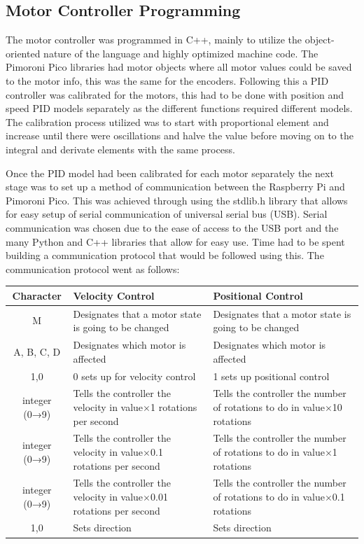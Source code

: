 \documentclass{article}
\begin{document}
\subsection{Motor Controller Programming}
The motor controller was programmed in C++, mainly to utilize the object-oriented nature of the language and highly optimized machine code. The Pimoroni Pico libraries
had motor objects where all motor values could be saved to the motor info, this was the same for the encoders. Following this a PID controller was calibrated for the
motors, this had to be done with position and speed PID models separately as the different functions required different models. The calibration process utilized was to
start with proportional element and increase until there were oscillations and halve the value before moving on to the integral and derivate elements with the same process.
\par
Once the PID model had been calibrated for each motor separately the next stage was to set up a method of communication between the Raspberry Pi and Pimoroni Pico.
This was achieved through using the stdlib.h library that allows for easy setup of serial communication of universal serial bus (USB). Serial communication was chosen
due to the ease of access to the USB port and the many Python and C++ libraries that allow for easy use. Time had to be spent building a communication protocol that would
be followed using this. The communication protocol went as follows:
\begin{center}
    \begin{tabular}{|c|p{7cm}|p{7cm}|}
        \hline
        Character & Velocity Control & Positional Control\\
        \hline
        M & Designates that a motor state is going to be changed & Designates that a motor state is going to be changed\\
        \hline
        A, B, C, D & Designates which motor is affected & Designates which motor is  affected\\
        \hline
        1,0 & 0 sets up for velocity control & 1 sets up positional control\\
        \hline
        integer (0→9) & Tells the controller the velocity in value$\times{}$1 rotations per second & Tells the controller the number of rotations to do in value$\times{}$10 rotations\\
        \hline
        integer (0→9) &Tells the controller the velocity in value$\times{}$0.1 rotations per second & Tells the controller the number of rotations to do in value$\times{}$1 rotations\\
        \hline
        integer (0→9) &Tells the controller the velocity in value$\times{}$0.01 rotations per second & Tells the controller the number of rotations to do in value$\times{}$0.1 rotations\\
        \hline
        1,0 & Sets direction & Sets direction\\
        \hline
    \end{tabular}
\end{center}
\end{document}
